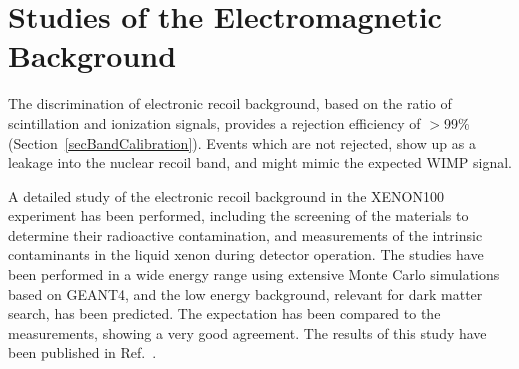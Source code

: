\chapter{Studies of the Electromagnetic Background}
\label{chERbackground}

The discrimination of electronic recoil background, based on the ratio of scintillation and ionization signals, provides a rejection efficiency of $>$99\% (Section~\ref{secBandCalibration}). Events which are not rejected, show up as a leakage into the nuclear recoil band, and might mimic the expected WIMP signal.

A detailed study of the electronic recoil background in the XENON100 experiment has been performed, including the screening of the materials to determine their radioactive contamination, and measurements of the intrinsic contaminants in the liquid xenon during detector operation. The studies have been performed in a wide energy range using  extensive Monte Carlo simulations based on GEANT4, and the low energy background, relevant for dark matter search, has been predicted. The expectation has been compared to the measurements, showing a very good agreement. The results of this study have been published in Ref.~\cite{EMBG}. 
